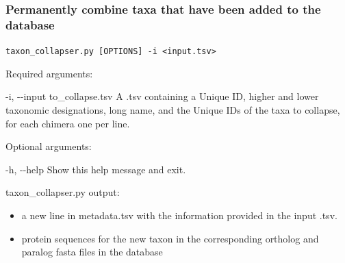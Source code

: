 \documentclass{article}
\def\code#1{\texttt{#1}}
\begin{document}
        \subsubsection{Permanently combine taxa that have been added to the database}
        \begin{description}
            
            \vspace{0.2cm}
            \item \code{taxon\_collapser.py [OPTIONS] -i <input.tsv>}
            \vspace{0.2cm}
            
            \begin{description}
                \item Required arguments:
                \begin{description}
                    \item -i, -\/-input \hspace{0.2cm} to\_collapse.tsv \hspace{0.2cm} A .tsv containing a Unique ID, higher and lower taxonomic designations, long name, and the Unique IDs of the taxa to collapse, for each chimera one per line.
                \end{description}
                \item Optional arguments:
                \begin{description}
                    \item -h, -\/-help \hspace{0.2cm} Show this help message and exit.
                \end{description}
            \end{description}
            \begin{description}
                \item taxon\_collapser.py output:
                \begin{itemize}
                    \item a new line in metadata.tsv with the information provided in the input .tsv.
                    \item protein sequences for the new taxon in the corresponding ortholog and paralog fasta files in the database
                \end{itemize}
            \end{description}
        \end{description}
        
\end{document}
